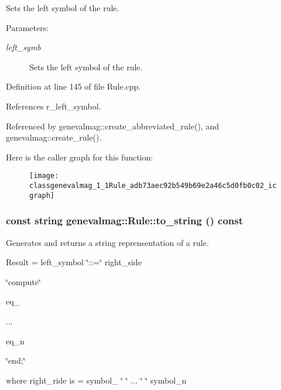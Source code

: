 Sets the left symbol of the rule. \begin{Desc}
\item[Parameters:]
\begin{description}
\item[{\em left\_\-symb}]Sets the left symbol of the rule. \end{description}
\end{Desc}


Definition at line 145 of file Rule.cpp.

References r\_\-left\_\-symbol.

Referenced by genevalmag::create\_\-abbreviated\_\-rule(), and genevalmag::create\_\-rule().

Here is the caller graph for this function:\nopagebreak
\begin{figure}[H]
\begin{center}
\leavevmode
\texttt{[image: classgenevalmag\_1\_1Rule\_adb73aec92b549b69e2a46c5d0fb0c02\_icgraph]}
\end{center}
\end{figure}
\hypertarget{classgenevalmag_1_1Rule_5efc9f6c6c576c52937ece211333a743}{
\subsubsection[{to\_\-string}]{\setlength{\rightskip}{0pt plus 5cm}const string genevalmag::Rule::to\_\-string () const}}
\label{classgenevalmag_1_1Rule_5efc9f6c6c576c52937ece211333a743}


Generates and returns a string reprensentation of a rule.\par
 \par
 Result = left\_\-symbol \char`\"{}::=\char`\"{} right\_\-side\par
 \char`\"{}compute\char`\"{}\par
 eq\_\par
 ...\par
 eq\_\-n\par
 \char`\"{}end;\char`\"{}\par
 \par
 where right\_\-ride is = symbol\_ \char`\"{} \char`\"{} ... \char`\"{} \char`\"{} symbol\_\-n\par


